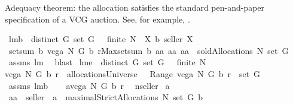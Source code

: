 \begin{isabellebody}
\begin{isamarkuptext}
Adequacy theorem: the allocation satisfies the standard pen-and-paper specification of a VCG auction.
See, for example, \cite[\S~1.2]{cramton}.%
\end{isamarkuptext}%
\isamarkuptrue%
\isamarkupfalse%
\ lm{}{}b{\isacharcolon}\ \ {\isachardoublequoteopen}distinct\ G{\isachardoublequoteclose}\ {\isachardoublequoteopen}set\ G\ {\isasymnoteq}\ {\isacharbraceleft}{\isacharbraceright}{\isachardoublequoteclose}\ {\isachardoublequoteopen}finite\ N{\isachardoublequoteclose}\ {\isachardoublequoteopen}{\isasymforall}\ X{\isachardot}\ b\ {\isacharparenleft}seller{\isacharcomma}\ X{\isacharparenright}{\isacharequal}{}{\isachardoublequoteclose}\ \isanewline
{}\ {\isachardoublequoteopen}setsum\ b\ {\isacharparenleft}vcga{\isacharprime}\ N\ G\ b\ r{\isacharparenright}{\isacharequal}Max{\isacharbraceleft}setsum\ b\ aa{\isacharbar}\ aa{\isachardot}\ aa\ {\isasymin}\ soldAllocations\ N\ {\isacharparenleft}set\ G{\isacharparenright}{\isacharbraceright}{\isachardoublequoteclose}\isanewline
%
\isadelimproof
%
\endisadelimproof
%
\isatagproof
{}\isamarkupfalse%
\ assms\ lm{}{}\ \isamarkupfalse%
\ blast%
\endisatagproof
{\isafoldproof}%
%
\isadelimproof
\isanewline
%
\endisadelimproof
\isanewline
{}\isamarkupfalse%
\ lm{}{}e{\isacharcolon}\ \ {\isachardoublequoteopen}distinct\ G{\isachardoublequoteclose}\ {\isachardoublequoteopen}set\ G\ {\isasymnoteq}\ {\isacharbraceleft}{\isacharbraceright}{\isachardoublequoteclose}\ {\isachardoublequoteopen}finite\ N{\isachardoublequoteclose}\ \isanewline
{\isachardoublequoteopen}vcga{\isacharprime}\ N\ G\ b\ r\ {\isasymin}\ allocationsUniverse\ {\isacharampersand}\ {\isasymUnion}\ Range\ {\isacharparenleft}vcga{\isacharprime}\ N\ G\ b\ r{\isacharparenright}\ {\isasymsubseteq}\ set\ G{\isachardoublequoteclose}%
\isadelimproof
\ %
\endisadelimproof
%
\isatagproof
{}\isamarkupfalse%
\ assms\ lm{}{}b\ \isanewline
{}\isamarkupfalse%
\ {\isacharminus}\isanewline
{}\isamarkupfalse%
\ {\isacharquery}a{\isacharequal}{\isachardoublequoteopen}vcga{\isacharprime}\ N\ G\ b\ r{\isachardoublequoteclose}\ \isamarkupfalse%
\ {\isacharquery}n{\isacharequal}seller\isanewline
{}\isamarkupfalse%
\ a\ \ \isanewline
{}{\isacharcolon}\ {\isachardoublequoteopen}{\isacharquery}a{\isacharequal}a\ {\isacharminus}{\isacharminus}\ seller\ {\isacharampersand}\ a\ {\isasymin}\ maximalStrictAllocations{\isacharprime}\ N\ {\isacharparenleft}set\ G{\isacharparenright}\ b{\isachardoublequoteclose}\isanewline

\end{isabellebody}
